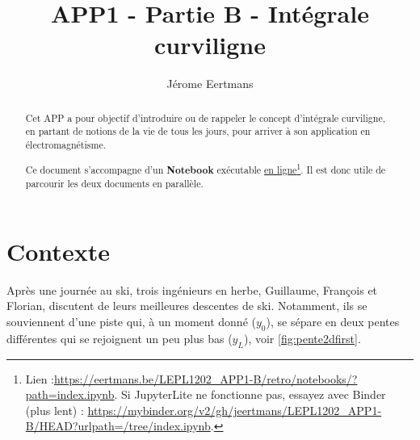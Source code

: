 \documentclass{cup-pan}
\author{Jérome Eertmans}
\title{APP1 - Partie B - Intégrale curviligne}
\date{}
\begin{document}
\maketitle

\begin{abstract}

Cet APP a pour objectif d'introduire ou de rappeler le concept d'intégrale curviligne, en partant de notions de la vie de tous les jours, pour arriver à son application en électromagnétisme.

Ce document s'accompagne d'un \textbf{Notebook} exécutable \href{https://eertmans.be/LEPL1202_APP1-B/retro/notebooks/?path=index.ipynb}{en ligne}\footnote{Lien :\url{https://eertmans.be/LEPL1202_APP1-B/retro/notebooks/?path=index.ipynb}. Si JupyterLite ne fonctionne pas, essayez avec Binder (plus lent) : \url{https://mybinder.org/v2/gh/jeertmans/LEPL1202_APP1-B/HEAD?urlpath=/tree/index.ipynb}.}. Il est donc utile de parcourir les deux documents en parallèle.

\end{abstract}

\section{Contexte}

Après une journée au ski, trois ingénieurs en herbe, Guillaume, François et Florian, discutent de leurs meilleures descentes de ski. Notamment, ils se souviennent d'une piste qui, à un moment donné ($y_0$), se sépare en deux pentes différentes qui se rejoignent un peu plus bas ($y_L$), voir \autoref{fig:pente2dfirst}. 
\end{document}
